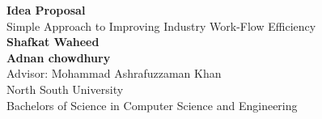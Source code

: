 \documentclass{article}
\begin{document}
	\begin{center}
    
    
		\LARGE{\textbf{Idea Proposal}} \\
        \vspace{1em}
        \Large{Simple Approach to Improving Industry Work-Flow Efficiency} \\
        \vspace{1em}
        \normalsize\textbf{Shafkat Waheed} \\
        \normalsize\textbf{Adnan chowdhury} \\
        \vspace{1em}
        \normalsize{Advisor: 
Mohammad Ashrafuzzaman Khan
} \\
        \vspace{1em}
        \normalsize{North South University} \\
        \normalsize{Bachelors of Science in Computer Science and Engineering}
     
	\end{center}
\end{document}
